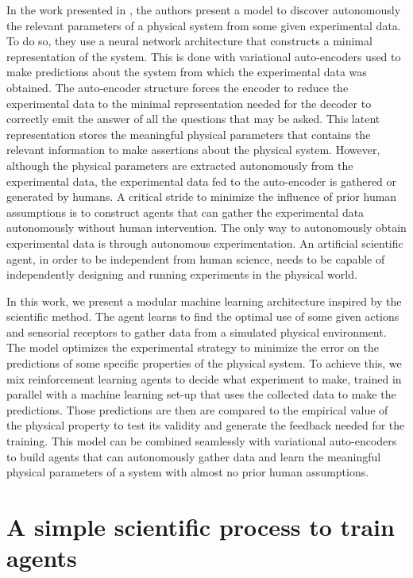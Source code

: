\documentclass[11pt,a4paper,twoside]{report}
\newcommand{\+}{\textnormal{+} }
\theoremstyle{definition}
\numberwithin{equation}{chapter}
\begin{document}
\par In the work presented in \cite{iten2020discovering}, the authors
present a model to discover autonomously the relevant parameters of a physical
system from some given experimental data. To do so, they use a neural network
architecture that constructs a minimal representation of the system. This is
done with variational auto-encoders used to make predictions about the
system from which the experimental data was obtained. The auto-encoder structure
forces the encoder to reduce the experimental data to the minimal representation
needed for the decoder to correctly emit the answer of all the questions that
may be asked. This latent representation stores the meaningful physical
parameters that contains the relevant information to make assertions about
the physical system. However, although the physical parameters are extracted
autonomously from the experimental data, the experimental data fed to the
auto-encoder is gathered or generated by humans. A critical stride to minimize
the influence of prior human assumptions is to construct agents that can gather
the experimental data autonomously without human intervention. The only way to
autonomously obtain experimental data is through autonomous experimentation. An
artificial scientific agent, in order to be independent from human science,
needs to be capable of independently designing and running experiments in the
physical world.

\par In this work, we present a modular machine learning architecture inspired
by the scientific method. The agent learns to find the optimal use of some given
actions and sensorial receptors to gather data from a simulated physical
environment. The model optimizes the experimental strategy to minimize the error
on the predictions of some specific properties of the physical system. To
achieve this, we mix reinforcement learning agents to decide what experiment to
make, trained in parallel with a machine learning set-up that uses the collected
data to make the predictions. Those predictions are then are compared to the
empirical value of the physical property to test its validity and generate the
feedback needed for the training. This model can be combined seamlessly with
variational auto-encoders to build agents that can autonomously gather data and
learn the meaningful physical parameters of a system with almost no prior human
assumptions.

\section*{A simple scientific process to train agents}
\end{document}
